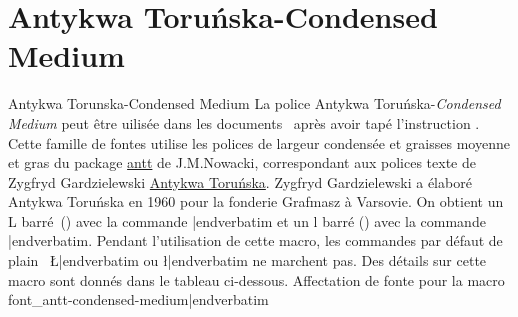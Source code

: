	\BlackBoxes								


















   \fontss
\section{{\sixteenbf\fontss Antykwa Toru\'nska}-{\sixteenslbf Condensed Medium}}{Antykwa Torunska-Condensed Medium}
\sample
\ii La police Antykwa Toru\'nska-{\sl Condensed Medium\/} peut \^etre uilis\'ee dans les documents  \capstex\ apr\`es avoir tap\'e l'instruction {\color{brown}\verbatim}. Cette famille de fontes utilise les polices de largeur condens\'ee et graisses moyenne et gras du package \href{http://www.tex.ac.uk/tex-archive/help/Catalogue/entries/antt.html}{antt} de J.\;M.\;Nowacki, correspondant aux polices texte de Zygfryd Gardzielewski \href{http://nowacki.strefa.pl/torunska-e.html}{Antykwa Toru\'nska}. Zygfryd Gardzielewski a \'elabor\'e Antykwa Toru\'nska en 1960 pour la fonderie Grafmasz \`a Varsovie. On obtient un L barr\'e~(\Lstroke) avec la commande {\color{brown}\verbatim\Lstroke|endverbatim} et un l barr\'e (\lstroke) avec la commande {\color{brown}\verbatim\lstroke|endverbatim}. Pendant l'utilisation de cette macro, les commandes par d\'efaut de plain \capstex\ {\color{brown}\verbatim\L|endverbatim} ou {\color{brown}\verbatim\l|endverbatim} ne marchent pas. Des d\'etails sur cette macro sont donn\'es dans le tableau ci-dessous.
\bs
\hfil{Affectation de fonte pour la macro {\color{brown}\verbatim font_antt-condensed-medium|endverbatim}}\hfil	

